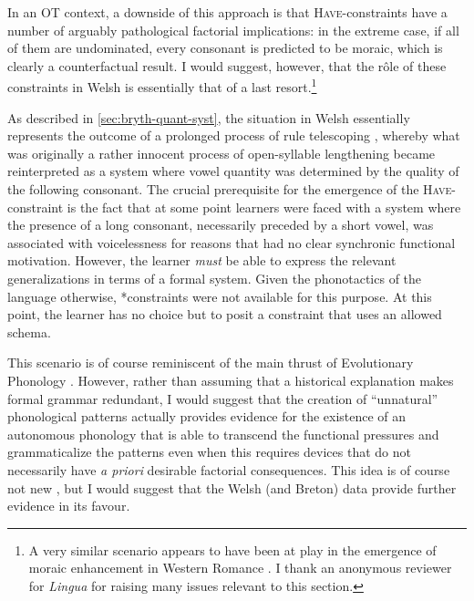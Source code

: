 In an OT context, a downside of this approach is that \textsc{Have}-\mo constraints have a number of arguably pathological factorial implications: in the extreme case, if all of them are undominated, every consonant is predicted to be moraic, which is clearly a counterfactual result. I would suggest, however, that the rôle of these constraints in Welsh is essentially that of a last resort.\footnote{A very similar scenario appears to have been at play in the emergence of moraic enhancement in Western Romance \citep{morin92:_what_friul,morin03:_syncop,loporcaro07:_facts,loporcaro11:_syllab,iosaded:_final_italy}. I thank an anonymous reviewer for \emph{Lingua} for raising many issues relevant to this section.}

As described in \cref{sec:bryth-quant-syst}, the situation in Welsh essentially represents the outcome of a prolonged process of rule telescoping \citep{bach72:_how}, whereby what was originally a rather innocent process of open\hyp syllable lengthening became reinterpreted as a system where vowel quantity was determined by the quality of the following consonant. The crucial prerequisite for the emergence of the \textsc{Have}-\mo constraint is the fact that at some point learners were faced with a system where the presence of a long consonant, necessarily preceded by a short vowel, was associated with voicelessness for reasons that had no clear synchronic functional motivation. However, the learner \emph{must} be able to express the relevant generalizations in terms of a formal system. Given the phonotactics of the language otherwise, *\mo[F] constraints were not available for this purpose. At this point, the learner has no choice but to posit a constraint that uses an allowed schema.

This scenario is of course reminiscent of the main thrust of Evolutionary Phonology \citep{blevins,blevins06:_evolut_phonol}. However, rather than assuming that a historical explanation makes formal grammar redundant, I would suggest that the creation of \enquote{unnatural} phonological patterns actually provides evidence for the existence of an autonomous phonology that is able to transcend the functional pressures and grammaticalize the patterns even when this requires devices that do not necessarily have \emph{a priori} desirable factorial consequences. This idea is of course not new \citep{bach72:_how,anderson81:_why}, but I would suggest that the Welsh (and Breton) data provide further evidence in its favour.

